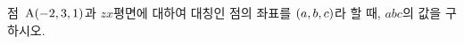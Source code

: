 점~$\mathrm{A}(-2{,}\mkern3mu\mathopen{}3{,}\mkern3mu\mathopen{}1)$과 $zx$평면에 대하여 대칭인 점의 좌표를 $(a{,}\mkern3mu\mathopen{}b{,}\mkern3mu\mathopen{}c)$라 할 때, $abc$의 값을 구하시오.
